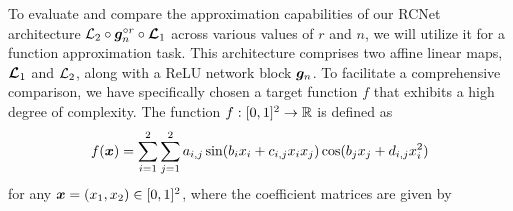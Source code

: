 \documentclass[nohyperref]{article}
\theoremstyle{plain}
\theoremstyle{definition}
\theoremstyle{remark}
\begin{document}
To evaluate and compare the approximation capabilities of our RCNet architecture ${\mathcal{L}}_2\circ{\bm{g}}_n^{\circ r}\circ{\bm{\mathcal{L}}}_1$ across various values of $r$ and $n$, we will utilize it for a function approximation task. This architecture comprises two affine linear maps, ${\bm{\mathcal{L}}}_1$ and ${\mathcal{L}}_2$, along with a ReLU network block ${\bm{g}}_n$.
To facilitate a comprehensive comparison, we have specifically chosen a target function $f$ that exhibits a high degree of complexity.
The function $f:[0,1]^2\to\R$ is defined as 
\begin{equation*}
	f({\bm{x}})= \sum_{i=1}^2\sum_{j=1}^2 a_{i,j} \sin(b_i x_i+c_{i,j} x_i x_j) \cos (b_j x_j + d_{i,j} x_i^2)
\end{equation*}
for any ${\bm{x}}=(x_1,x_2)\in[0,1]^2$, where  the coefficient matrices are given by
\end{document}
